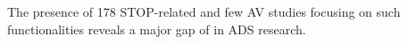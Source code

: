 \vspace{-1ex}
\begin{finding}
\label{finding:rq4_stop}
    The presence of 178 STOP-related \bfps and few AV studies focusing on such functionalities reveals a major gap of  in ADS research.
\end{finding}
\vspace{-1ex}
